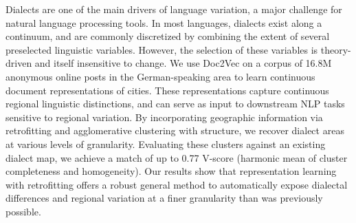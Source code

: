 Dialects are one of the main drivers of language variation, a major challenge for natural language processing tools. In most languages, dialects exist along a continuum, and are commonly discretized by combining the extent of several preselected linguistic variables. However, the selection of these variables is theory-driven and itself insensitive to change. We use Doc2Vec on a corpus of 16.8M anonymous online posts in the German-speaking area to learn continuous document representations of cities. These representations capture continuous regional linguistic distinctions, and can serve as input to downstream NLP tasks sensitive to regional variation. By incorporating geographic information via retrofitting and agglomerative clustering with structure, we recover dialect areas at various levels of granularity. Evaluating these clusters against an existing dialect map, we achieve a match of up to 0.77 V-score (harmonic mean of cluster completeness and homogeneity). Our results show that representation learning with retrofitting offers a robust general method to automatically expose dialectal differences and regional variation at a finer granularity than was previously possible.
